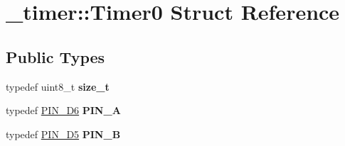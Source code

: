 \hypertarget{struct__timer_1_1Timer0}{}\section{\+\_\+timer\+:\+:Timer0 Struct Reference}
\label{struct__timer_1_1Timer0}
\subsection*{Public Types}
\begin{DoxyCompactItemize}
\item 
typedef uint8\+\_\+t {\bfseries size\+\_\+t}\hypertarget{struct__timer_1_1Timer0_ae657967e46144d5bd2581d9551ee58d9}{}\label{struct__timer_1_1Timer0_ae657967e46144d5bd2581d9551ee58d9}

\item 
typedef \hyperlink{structports_1_1Pin}{P\+I\+N\+\_\+\+D6} {\bfseries P\+I\+N\+\_\+A}\hypertarget{struct__timer_1_1Timer0_a29d1da3676a5022eae7322a5d92e5549}{}\label{struct__timer_1_1Timer0_a29d1da3676a5022eae7322a5d92e5549}

\item 
typedef \hyperlink{structports_1_1Pin}{P\+I\+N\+\_\+\+D5} {\bfseries P\+I\+N\+\_\+B}\hypertarget{struct__timer_1_1Timer0_afff9d9d179772b8a79508e46580f0cf0}{}\label{struct__timer_1_1Timer0_afff9d9d179772b8a79508e46580f0cf0}

\end{DoxyCompactItemize}
